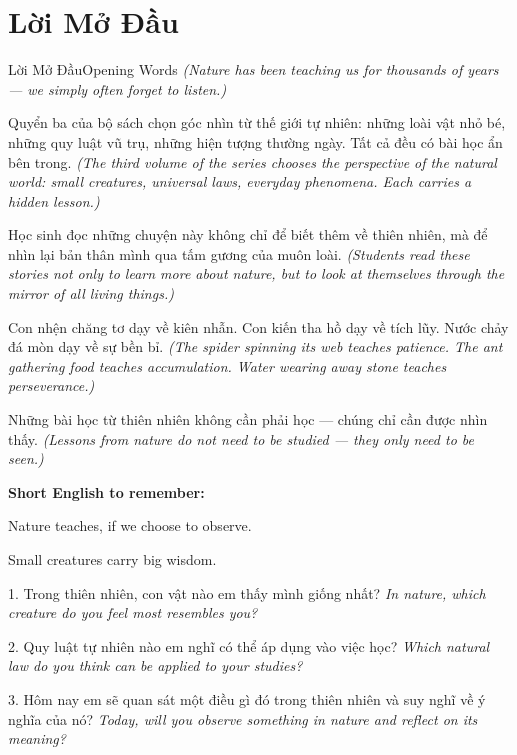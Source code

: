 \chapter*{Lời Mở Đầu}

\begin{truyen}{Lời Mở Đầu}{Opening Words}
\textit{(Nature has been teaching us for thousands of years --- we simply often forget to listen.)}

Quyển ba của bộ sách chọn góc nhìn từ thế giới tự nhiên: những loài vật nhỏ bé, những quy luật vũ trụ, những hiện tượng thường ngày. Tất cả đều có bài học ẩn bên trong.
\textit{(The third volume of the series chooses the perspective of the natural world: small creatures, universal laws, everyday phenomena. Each carries a hidden lesson.)}

Học sinh đọc những chuyện này không chỉ để biết thêm về thiên nhiên, mà để nhìn lại bản thân mình qua tấm gương của muôn loài.
\textit{(Students read these stories not only to learn more about nature, but to look at themselves through the mirror of all living things.)}

Con nhện chăng tơ dạy về kiên nhẫn. Con kiến tha hồ dạy về tích lũy. Nước chảy đá mòn dạy về sự bền bỉ.
\textit{(The spider spinning its web teaches patience. The ant gathering food teaches accumulation. Water wearing away stone teaches perseverance.)}
\end{truyen}

\begin{baihoc}
Những bài học từ thiên nhiên không cần phải học --- chúng chỉ cần được nhìn thấy.
\textit{(Lessons from nature do not need to be studied --- they only need to be seen.)}
\end{baihoc}

\begin{tcolorbox}[colback=truyenblue!6,colframe=truyenblue,coltitle=white,fonttitle=\bfseries,title={Easy English},arc=4pt,boxrule=1pt,breakable]
\textbf{Short English to remember:}

Nature teaches, if we choose to observe.

Small creatures carry big wisdom.
\end{tcolorbox}

\begin{tcolorbox}[colback=truyengold!10,colframe=truyengold!70!black,coltitle=black,fonttitle=\bfseries,title={Tự Học Nhanh},arc=4pt,boxrule=1pt,breakable]
1. Trong thiên nhiên, con vật nào em thấy mình giống nhất? \textit{In nature, which creature do you feel most resembles you?}

2. Quy luật tự nhiên nào em nghĩ có thể áp dụng vào việc học? \textit{Which natural law do you think can be applied to your studies?}

3. Hôm nay em sẽ quan sát một điều gì đó trong thiên nhiên và suy nghĩ về ý nghĩa của nó? \textit{Today, will you observe something in nature and reflect on its meaning?}
\end{tcolorbox}

\ngancach

